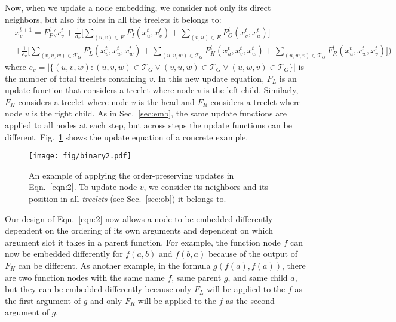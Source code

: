 \documentclass{article}
\begin{document}
Now, when we update a node embedding, we consider not only its direct neighbors, but also
its roles in all the treelets it belongs to: 
\begin{equation}
\begin{aligned}
&x_v^{t+1}=F_P^t\Big(x_v^t+\frac{1}{d_v}\Big[ \sum_{(u,v)\in E}F_{I}^t(x_u^t, x_v^t)+\sum_{(v,u)\in
  E}F_{O}^t (x_v^t , x_u^t)\Big] \\
&+\frac{1}{e_v}\Big[ \sum_{(v,u,w)\in \mathcal{T}_G} F_{L}^t(x_v^t , x_{u}^t , x_{w}^t )
+\sum_{(u,v,w)\in \mathcal{T}_G} F_{H}^t(x_u^t , x_{v}^t , x_{w}^t ) + \sum_{(u,w,v)\in \mathcal{T}_G}
F_{R}^t(x_u^t , x_{w}^t , x_{v}^t )\Big]\Big)
\label{eqn:2}
\end{aligned}
\end{equation}
where $e_v = |\{(u,v,w) : (u,v,w) \in \mathcal{T}_G \vee (v,u,w) \in \mathcal{T}_G \vee
(u,w,v) \in \mathcal{T}_G \}|$ is the number of total treelets containing $v$. 
In this new update equation, $F_L$ is an update function that considers a treelet where
node $v$ is the left child. Similarly, $F_H$ considers a treelet where node $v$ is the
head and $F_R$ considers a treelet where node $v$ is the right
child. As in Sec.~\ref{sec:emb}, the same update functions are applied to all nodes at each step,
but across steps the update functions can be different.  Fig.~\ref{fig:binary} shows the
update equation of a concrete example. 

\begin{figure}
  \centering
    \texttt{[image: fig/binary2.pdf]}
  \caption{An example of applying the order-preserving updates in Eqn.~\ref{eqn:2}. To
    update node $v$, we consider its neighbors and its position in all \emph{treelets} (see
    Sec.~\ref{sec:ob}) it belongs to. }
  \label{fig:binary}
  \vspace{-4mm}
\end{figure}

Our design of Eqn.~\ref{eqn:2} now allows a node to be embedded differently dependent on
the ordering of its own arguments and dependent on which argument slot it takes in a parent
function. For example, the function node $f$ can now be embedded differently for $f(a,b)$
and $f(b,a)$ because of the output of $F_H$ can be different. As another example, in the formula
$g(f(a),f(a))$, there are two function nodes with the same name $f$, same parent $g$, and
same child $a$, but they can be embedded differently because only $F_L$ will be applied to the $f$ as the first
argument of $g$ and only $F_R$ will be applied to the $f$ as the second argument of
$g$. 
\end{document}
